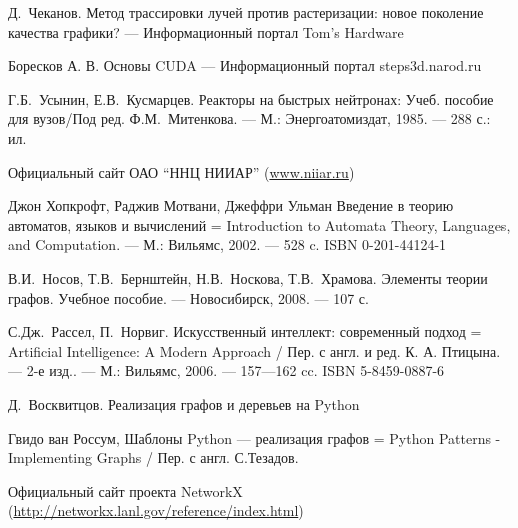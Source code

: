 \newpage
{}
\begin{thebibliography}{0}
Д.~Чеканов. Метод трассировки лучей против растеризации: новое поколение качества графики? ---
 Информационный портал Tom's Hardware

Боресков А. В. Основы CUDA ---  Информационный портал steps3d.narod.ru

Г.Б.~Усынин, Е.В.~Кусмарцев. Реакторы на быстрых нейтронах: Учеб. пособие для вузов/Под ред. Ф.М.~Митенкова. --- 
М.: Энергоатомиздат, 1985. --- 288 с.: ил.

Официальный сайт ОАО ``ННЦ НИИАР'' (\href{http://www.niiar.ru/}{www.niiar.ru})

Джон Хопкрофт, Раджив Мотвани, Джеффри Ульман Введение в теорию автоматов, языков и вычислений = Introduction to Automata Theory, Languages, and Computation. --- 
М.: Вильямс, 2002. --- 528 c. 
ISBN 0-201-44124-1

В.И.~Носов, Т.В.~Бернштейн, Н.В.~Носкова, Т.В.~Храмова. Элементы теории графов. Учебное пособие. ---
Новосибирск, 2008. --- 107 с.

С.Дж.~Рассел, П.~Норвиг. Искусственный интеллект: современный подход = Artificial Intelligence: A Modern Approach / Пер. с англ. и ред. К. А. Птицына. --- 2-е изд.. --- 
М.: Вильямс, 2006. --- 157—162 cc.
ISBN 5-8459-0887-6

Д.~Восквитцов. Реализация графов и деревьев на Python

Гвидо ван Россум, Шаблоны Python --- реализация графов = Python Patterns - Implementing Graphs / Пер. с англ. С.Тезадов. 

Официальный сайт проекта NetworkX (\href{http://networkx.lanl.gov/reference/index.html}{http://networkx.lanl.gov/reference/index.html})
\end{thebibliography}
